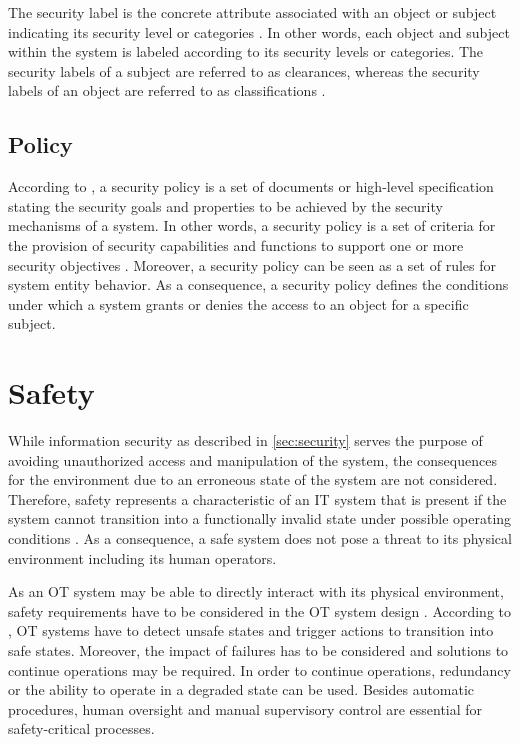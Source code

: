The security label is the concrete attribute associated with an object or subject indicating its security level or categories \cite{JTF2020}.
In other words, each object and subject within the system is labeled according to its security levels or categories.
The security labels of a subject are referred to as clearances, whereas the security labels of an object are referred to as classifications \cite{CNSS2022}.

\subsection{Policy}
According to \citeauthor{Anderson2002} \cite{Anderson2002}, a security policy is a set of documents or high-level specification stating the security goals and properties to be achieved by the security mechanisms of a system.
In other words, a security policy is a set of criteria for the provision of security capabilities and functions to support one or more security objectives \cite{JTF2020}.
Moreover, a security policy can be seen as a set of rules for system entity behavior.
As a consequence, a security policy defines the conditions under which a system grants or denies the access to an object for a specific subject. 

\section{Safety}
\label{sec:safety}
While information security as described in \autoref{sec:security} serves the purpose of avoiding unauthorized access and manipulation of the system, the consequences for the environment due to an erroneous state of the system are not considered.
Therefore, safety represents a characteristic of an IT system that is present if the system cannot transition into a functionally invalid state under possible operating conditions \cite{Eckert2023}.
As a consequence, a safe system does not pose a threat to its physical environment including its human operators.

As an OT system may be able to directly interact with its physical environment, safety requirements have to be considered in the OT system design \cite{Stouffer2023}.
According to \citeauthor{Stouffer2023}, OT systems have to detect unsafe states and trigger actions to transition into safe states.
Moreover, the impact of failures has to be considered and solutions to continue operations may be required.
In order to continue operations, redundancy or the ability to operate in a degraded state can be used.
Besides automatic procedures, human oversight and manual supervisory control are essential for safety-critical processes.

